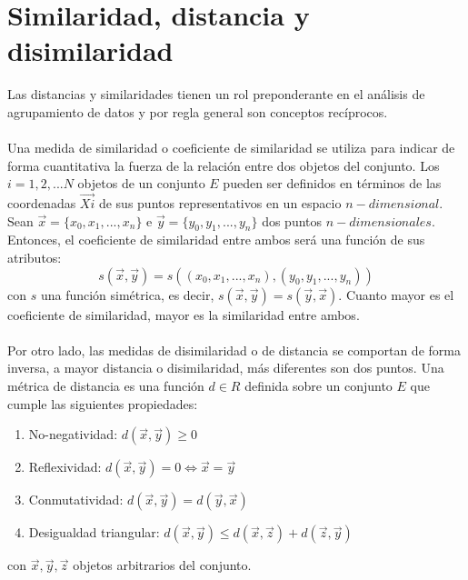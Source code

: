 \section{Similaridad, distancia y disimilaridad}
Las distancias y similaridades tienen un rol preponderante en el análisis de agrupamiento de datos y por regla general son conceptos recíprocos.\\\\
Una medida de similaridad o coeficiente de similaridad se utiliza para indicar de forma cuantitativa la fuerza de la relación entre dos objetos del conjunto. Los $i = 1, 2, ...N$ objetos de un conjunto $E$ pueden ser definidos en términos de las coordenadas $\vec{Xi}$ de sus puntos representativos en un espacio $n-dimensional$. Sean $\vec{x}=\{x_0, x_1,...,x_n\}$ e $\vec{y}=\{y_0, y_1,...,y_n\}$ dos puntos $n-dimensionales$. Entonces, el coeficiente de similaridad entre ambos será una función de sus atributos:
\begin{equation}
	s(\vec{x}, \vec{y}) = s((x_0, x_1,...,x_n), (y_0, y_1,...,y_n))
\end{equation}
con $s$ una función simétrica, es decir, $s(\vec{x}, \vec{y}) = s(\vec{y}, \vec{x})$. Cuanto mayor es el coeficiente de similaridad, mayor es la similaridad entre ambos.\\\\
Por otro lado, las medidas de disimilaridad o de distancia se comportan de forma inversa, a mayor distancia o disimilaridad, más diferentes son dos puntos.
Una métrica de distancia es una función $d \in R$ definida sobre un conjunto $E$ que cumple las siguientes propiedades:
\begin{enumerate}
\item No-negatividad: $d(\vec{x}, \vec{y}) \geq 0$
\item Reflexividad: $d(\vec{x}, \vec{y}) = 0 \iff \vec{x} = \vec{y}$
\item Conmutatividad: $d(\vec{x}, \vec{y}) = d(\vec{y}, \vec{x})$
\item Desigualdad triangular: $d(\vec{x}, \vec{y}) \leq d(\vec{x}, \vec{z}) + d(\vec{z}, \vec{y})$
\end{enumerate}
con $\vec{x},\vec{y},\vec{z}$ objetos arbitrarios del conjunto.\\\\

